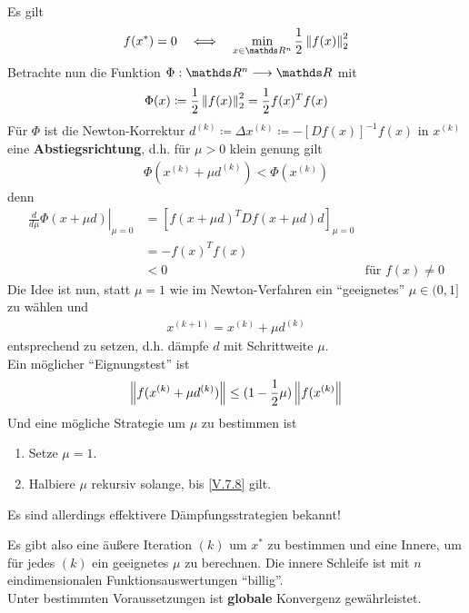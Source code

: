 Es gilt
\begin{gather}
  f(x^{*}) = 0 \quad \Longleftrightarrow \quad 
  \min_{x\in\Ren} \frac{1}{2} \nn{f(x)}_2^2
  \label{V.7.5}
\end{gather}
Betrachte nun die Funktion $\Phi: \Ren\longrightarrow \R$ mit 
\begin{gather*}
  \Phi (x) \coloneqq \frac{1}{2} \left\| f(x) \right\|_2^2 
  = \frac{1}{2} f(x)^T f(x)
\end{gather*}
Für $\Phi$ ist die Newton-Korrektur
$d^{(k)} \coloneqq \Delta x^{(k)} \coloneqq -[Df(x)]^{-1}f(x)$
in $x^{(k)} $ eine \textbf{Abstiegsrichtung},
d.h. für $\mu >0 $ klein genung gilt
\begin{gather}
  \Phi(x^{(k)}+\mu d^{(k)}) < \Phi(x^{(k)} )
  \label{V.7.6}
\end{gather}
denn 
\begin{align*}
  \left.\frac{d}{d\mu} \Phi(x+\mu d)\right\vert_{\mu = 0} 
  &= \left[f(x+\mu d)^TDf(x+\mu d)d\right]_{\mu = 0}\\
  &= -f(x)^Tf(x) \\
  &< 0 & \text{für } f(x)\neq 0
\end{align*}
Die Idee ist nun, statt $\mu = 1$ wie im Newton-Verfahren
ein \enquote{geeignetes} $\mu \in (0,1]$ zu wählen und 
\begin{gather}
  x^{(k+1)} = x^{(k)} +\mu d^{(k)}
  \label{V.7.7}
\end{gather}
entsprechend zu setzen, d.h. dämpfe $d$ mit Schrittweite $\mu$.\\
Ein möglicher \enquote{Eignungstest} ist
\begin{gather}
  \left\| f(x^{(k)}+\mu d^{(k)}) \right\|
  \leq (1-\frac{1}{2}\mu )\left\| f(x^{(k)} \right\|
  \label{V.7.8}
\end{gather}
Und eine mögliche Strategie um $\mu $ zu bestimmen ist 
\begin{enumerate}[1.]
\item Setze $\mu=1$.
\item Halbiere $\mu$ rekursiv solange, bis \eqref{V.7.8} gilt.
\end{enumerate}
Es sind allerdings effektivere Dämpfungsstrategien bekannt!

Es gibt also eine äußere Iteration $(k)$
um $x^{*}$ zu bestimmen
und eine Innere, um für jedes $(k)$
ein geeignetes $\mu$ zu berechnen.
Die innere Schleife ist mit $n$ eindimensionalen Funktionsauswertungen
\enquote{billig}. \\
Unter bestimmten Voraussetzungen ist
\textbf{globale} Konvergenz gewährleistet.

